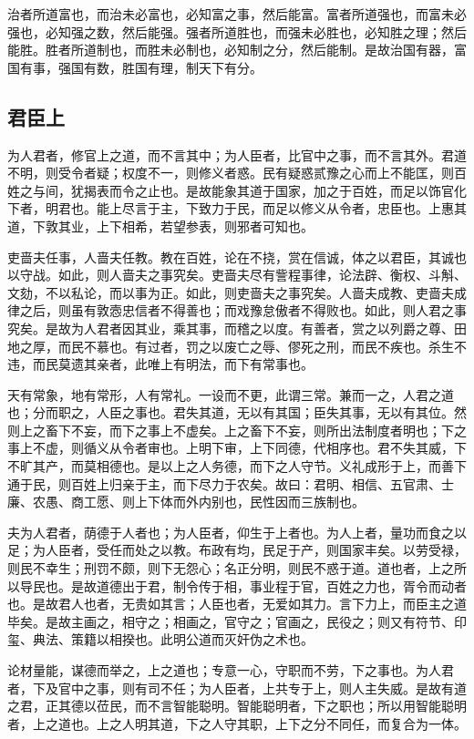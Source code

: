 \documentclass[]{article}
\begin{document}
治者所道富也，而治未必富也，必知富之事，然后能富。富者所道强也，而富未必强也，必知强之数，然后能强。强者所道胜也，而强未必胜也，必知胜之理；然后能胜。胜者所道制也，而胜未必制也，必知制之分，然后能制。是故治国有器，富国有事，强国有数，胜国有理，制天下有分。

\hypertarget{header-n404}{%
\subsection{君臣上}\label{header-n404}}

为人君者，修官上之道，而不言其中；为人臣者，比官中之事，而不言其外。君道不明，则受令者疑；权度不一，则修义者惑。民有疑惑贰豫之心而上不能匡，则百姓之与间，犹揭表而令之止也。是故能象其道于国家，加之于百姓，而足以饰官化下者，明君也。能上尽言于主，下致力于民，而足以修义从令者，忠臣也。上惠其道，下敦其业，上下相希，若望参表，则邪者可知也。

吏啬夫任事，人啬夫任教。教在百姓，论在不挠，赏在信诚，体之以君臣，其诚也以守战。如此，则人啬夫之事究矣。吏啬夫尽有訾程事律，论法辟、衡权、斗斛、文劾，不以私论，而以事为正。如此，则吏啬夫之事究矣。人啬夫成教、吏啬夫成律之后，则虽有敦悫忠信者不得善也；而戏豫怠傲者不得败也。如此，则人君之事究矣。是故为人君者因其业，乘其事，而稽之以度。有善者，赏之以列爵之尊、田地之厚，而民不慕也。有过者，罚之以废亡之辱、僇死之刑，而民不疾也。杀生不违，而民莫遗其亲者，此唯上有明法，而下有常事也。

天有常象，地有常形，人有常礼。一设而不更，此谓三常。兼而一之，人君之道也；分而职之，人臣之事也。君失其道，无以有其国；臣失其事，无以有其位。然则上之畜下不妄，而下之事上不虚矣。上之畜下不妄，则所出法制度者明也；下之事上不虚，则循义从令者审也。上明下审，上下同德，代相序也。君不失其威，下不旷其产，而莫相德也。是以上之人务德，而下之人守节。义礼成形于上，而善下通于民，则百姓上归亲于主，而下尽力于农矣。故曰：君明、相信、五官肃、士廉、农愚、商工愿、则上下体而外内别也，民性因而三族制也。

夫为人君者，荫德于人者也；为人臣者，仰生于上者也。为人上者，量功而食之以足；为人臣者，受任而处之以教。布政有均，民足于产，则国家丰矣。以劳受禄，则民不幸生；刑罚不颇，则下无怨心；名正分明，则民不惑于道。道也者，上之所以导民也。是故道德出于君，制令传于相，事业程于官，百姓之力也，胥令而动者也。是故君人也者，无贵如其言；人臣也者，无爱如其力。言下力上，而臣主之道毕矣。是故主画之，相守之；相画之，官守之；官画之，民役之；则又有符节、印玺、典法、策籍以相揆也。此明公道而灭奸伪之术也。

论材量能，谋德而举之，上之道也；专意一心，守职而不劳，下之事也。为人君者，下及官中之事，则有司不任；为人臣者，上共专于上，则人主失威。是故有道之君，正其德以莅民，而不言智能聪明。智能聪明者，下之职也；所以用智能聪明者，上之道也。上之人明其道，下之人守其职，上下之分不同任，而复合为一体。
\end{document}
